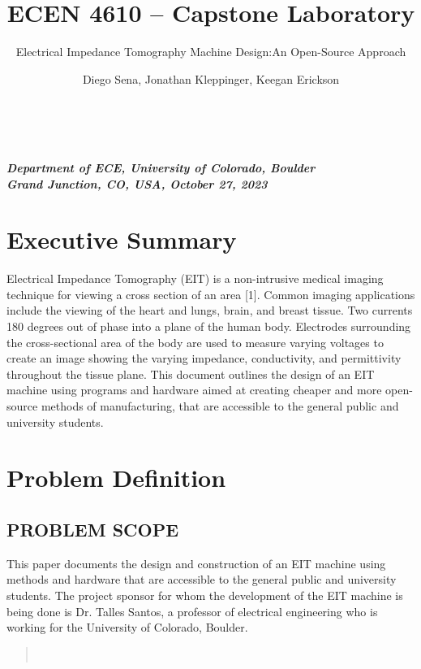 

\title{ECEN 4610 -- Capstone Laboratory}

\subtitle{Electrical Impedance Tomography Machine Design:}\\
\subtitle{An Open-Source Approach}

\author{Diego Sena, Jonathan Kleppinger, Keegan Erickson}

\emph{\textbf{Department of ECE, University of Colorado, Boulder}}\\
\emph{\textbf{Grand Junction, CO, USA, October 27, 2023}}

\emph{\textbf{\hfill\break
}}


\section{Executive Summary~}\label{executive-summary}
Electrical Impedance Tomography (EIT) is a non-intrusive medical imaging
technique for viewing a cross section of an area {[}1{]}. Common imaging
applications include the viewing of the heart and lungs, brain, and
breast tissue. Two currents 180 degrees out of phase into a plane of the
human body. Electrodes surrounding the cross-sectional area of the body
are used to measure varying voltages to create an image showing the
varying impedance, conductivity, and permittivity throughout the tissue
plane. This document outlines the design of an EIT machine using
programs and hardware aimed at creating cheaper and more open-source
methods of manufacturing, that are accessible to the general public and
university students.~

\section{Problem Definition~}\label{problem-definition}

\subsection{PROBLEM SCOPE~~~}\label{problem-scope}

This paper documents the design and construction of an EIT machine using
methods and hardware that are accessible to the general public and
university students. The project sponsor for whom the development of the
EIT machine is being done is Dr. Talles Santos, a professor of
electrical engineering who is working for the University of Colorado,
Boulder.~~

\begin{quote}
~
\end{quote}


